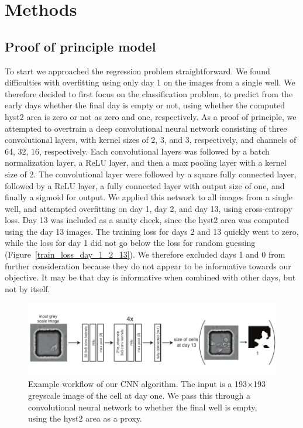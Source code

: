 \documentclass[10pt,twocolumn,letterpaper]{article}
\begin{document}


 \section{Methods}
 
 \subsection{Proof of principle model}
 \label{proof_of_principle}
 
 To start we approached the regression problem straightforward.  We found difficulties with overfitting using only day 1 on the images from a single well.  We therefore decided to first focus on the classification problem, to predict from the early days whether the final day is empty or not, using whether the computed hyst2 area is zero or not as zero and one, respectively.   As a proof of principle, we attempted to overtrain a deep convolutional neural network consisting of three convolutional layers, with kernel sizes of 2, 3, and 3, respectively, and channels of 64, 32, 16, respectively.  Each convolutional layers was followed by a batch normalization layer, a ReLU layer, and then a max pooling layer with a kernel size of 2.  The convolutional layer were followed by a square fully connected layer, followed by a ReLU layer, a fully connected layer with output size of one, and finally a sigmoid for output.  We applied this network to all images from a single well, and attempted overfitting on day 1, day 2, and day 13, using cross-entropy loss.  Day 13 was included as a sanity check, since the hyst2 area was computed using the day 13 images.  The training loss for days 2 and 13 quickly went to zero, while the loss for day 1 did not go below the loss for random guessing (Figure~\ref{train_loss_day_1_2_13}).  We therefore excluded days 1 and 0 from further consideration because they do not appear to be informative towards our objective.  It may be that day is informative when combined with other days, but not by itself.
 
 \begin{figure}[t!]
\begin{center}
\includegraphics[width=0.8\linewidth]{figures/networkExampleImage_v2.pdf}
\end{center}
   \caption{Example workflow of our CNN algorithm.  The input is a 193$\times$193 greyscale image of the cell at day one.  We pass this through a convolutional neural network to whether the final well is empty, using the hyst2 area as a proxy.}
\label{workflow}
\end{figure}
\end{document}

